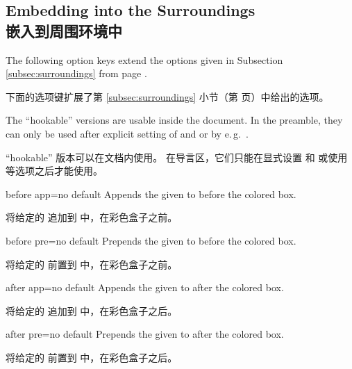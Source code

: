 
\subsection{Embedding into the Surroundings\\嵌入到周围环境中}
The following option keys extend the options given in Subsection \ref{subsec:surroundings}
from page \pageref{subsec:surroundings}.

下面的选项键扩展了第 \ref{subsec:surroundings} 小节（第 \pageref{subsec:surroundings} 页）中给出的选项。
\begin{marker}
The \enquote{hookable} versions are usable inside the document.
In the preamble, they can only be used after explicit setting of
 and  or by e.\,g.\ .

“hookable” 版本可以在文档内使用。
在导言区，它们只能在显式设置  和  或使用  等选项之后才能使用。
\end{marker}

\begin{docTcbKey}{before app}{=}{no default}
Appends the given  to  before the colored box.

将给定的  追加到  中，在彩色盒子之前。
\end{docTcbKey}

\begin{docTcbKey}{before pre}{=}{no default}
Prepends the given  to  before the colored box.

将给定的  前置到  中，在彩色盒子之前。
\end{docTcbKey}

\begin{docTcbKey}{after app}{=}{no default}
Appends the given  to  after the colored box.

将给定的  追加到  中，在彩色盒子之后。
\end{docTcbKey}

\begin{docTcbKey}{after pre}{=}{no default}
Prepends the given  to  after the colored box.

将给定的  前置到  中，在彩色盒子之后。
\end{docTcbKey}

